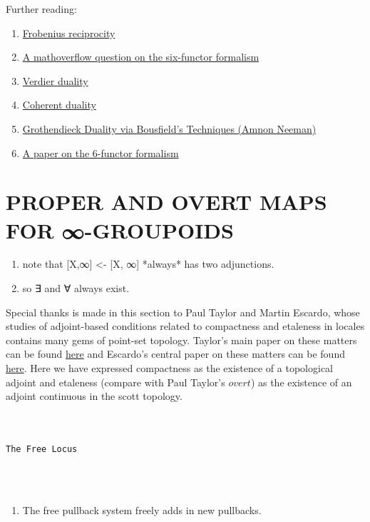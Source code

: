 \documentclass{book}
\theoremstyle{definition}
\renewcommand{\chapter}[1]{
\newpage
{
\Huge 
\begin{center}
\ \\
\ \\
\thispagestyle{empty}
\texttt{#1}
\end{center}}
\ \\
\ \\
}
\begin{document}
Further reading:
\begin{enumerate}
\item \href{https://ncatlab.org/nlab/show/Frobenius+reciprocity}{Frobenius reciprocity}
\item \href{https://mathoverflow.net/questions/404706/how-duality-follows-from-a-six-functor-formalism}{A mathoverflow question on the six-functor formalism}
\item \href{https://en.wikipedia.org/wiki/Verdier_duality}{Verdier duality}
\item \href{https://en.wikipedia.org/wiki/Coherent_duality}{Coherent duality}
\item \href{https://www.ams.org/journals/jams/1996-9-01/S0894-0347-96-00174-9/S0894-0347-96-00174-9.pdf}{Grothendieck Duality via Bousfield's Techniques (Amnon Neeman)}
\item \href{https://arxiv.org/pdf/1501.01999.pdf}{A paper on the 6-functor formalism}
\end{enumerate} 




\part{PROPER AND OVERT MAPS FOR ∞-GROUPOIDS}


\begin{enumerate}
\item note that [X,∞] <- [X, ∞] *always* has two adjunctions. 
\item so ∃ and ∀ always exist. 
\end{enumerate}

Special thanks is made in this section to Paul Taylor and Martin Escardo, whose studies of adjoint-based conditions related to compactness and etaleness in locales contains many gems of point-set topology. Taylor's main paper on these matters can be found \href{https://paultaylor.eu/ASD/foufct/foufct.pdf}{here} and Escardo's central paper on these matters can be found \href{https://www.cs.bham.ac.uk/~mhe/papers/barbados.pdf}{here}. Here we have expressed compactness as the existence of a topological adjoint and etaleness (compare with Paul Taylor's $\textit{overt}$) as the existence of an adjoint continuous in the scott topology. 


\chapter{The Free Locus}

\begin{enumerate}
\item The free pullback system freely adds in new pullbacks.
\end{enumerate}
\end{document}
